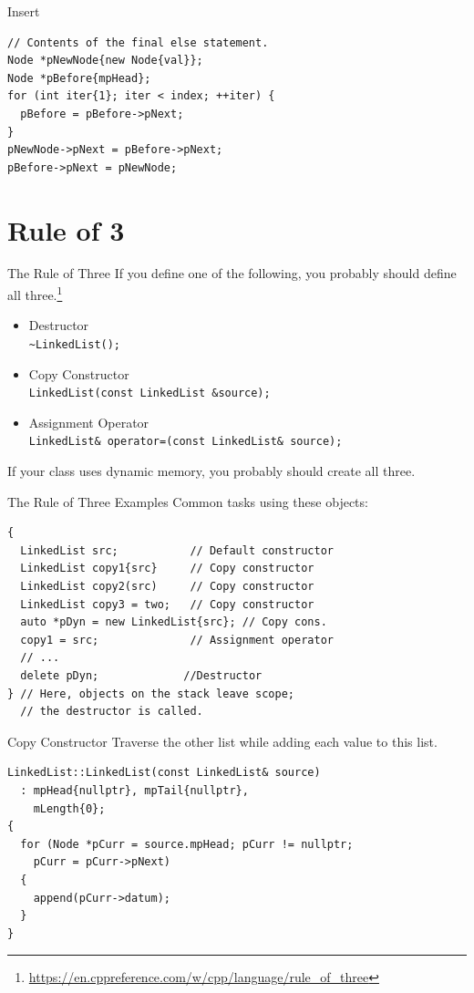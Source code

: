 \documentclass[14pt,aspectratio=1610, hyperref={pdfpagelayout=SinglePage}]{beamer}
\begin{document}
\begin{frame}[fragile]{Insert}
\begin{lstlisting}
// Contents of the final else statement.
Node *pNewNode{new Node{val}};
Node *pBefore{mpHead};
for (int iter{1}; iter < index; ++iter) {
  pBefore = pBefore->pNext;
}
pNewNode->pNext = pBefore->pNext;
pBefore->pNext = pNewNode;
\end{lstlisting}
\end{frame}


\section{Rule of 3}

\begin{frame}[fragile]{The Rule of Three}
If you define one of the following, you probably should define all three.\footnote{\url{https://en.cppreference.com/w/cpp/language/rule_of_three}}
\begin{itemize}
\item Destructor\\
  \lstinline{~LinkedList();}
\item Copy Constructor\\
  \lstinline{LinkedList(const LinkedList &source);}
\item Assignment Operator\\
  \lstinline{LinkedList& operator=(const LinkedList& source);}
\end{itemize}
If your class uses dynamic memory, you probably should create all three.
\end{frame}


\begin{frame}[fragile]{The Rule of Three Examples}
Common tasks using these objects:
\begin{lstlisting}[basicstyle=\small\ttfamily]
{
  LinkedList src;           // Default constructor
  LinkedList copy1{src}     // Copy constructor
  LinkedList copy2(src)     // Copy constructor
  LinkedList copy3 = two;   // Copy constructor
  auto *pDyn = new LinkedList{src}; // Copy cons.
  copy1 = src;              // Assignment operator
  // ...
  delete pDyn;             //Destructor
} // Here, objects on the stack leave scope;
  // the destructor is called.
\end{lstlisting}
\end{frame}

\begin{frame}[fragile]{Copy Constructor}
Traverse the other list while adding each value to this list.
\begin{lstlisting}[basicstyle=\small\ttfamily]
LinkedList::LinkedList(const LinkedList& source)
  : mpHead{nullptr}, mpTail{nullptr},
    mLength{0};
{
  for (Node *pCurr = source.mpHead; pCurr != nullptr;
    pCurr = pCurr->pNext)
  {
    append(pCurr->datum);
  }
}
\end{lstlisting}
\end{frame}
\end{document}
